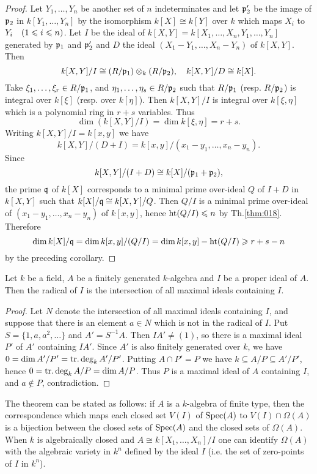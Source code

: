 \documentclass[../main]{subfiles}
\begin{document}
\begin{proof}
Let $Y_1,\ldots,Y_n$ be another set of $n$ indeterminates and let $\mathfrak{p}_2'$ be the image of $\mathfrak{p}_2$ in $k[Y_1,\ldots,Y_n]$ by the isomorphism $k[X]\cong k[Y]$ over $k$ which maps $X_i$ to $Y_i\for{1\leqslant i\leqslant n}$. Let $I$ be the ideal of $k[X,Y] = k[X_1,\ldots,X_n,Y_1,\ldots,Y_n]$ generated by $\mathfrak{p}_1$ and $\mathfrak{p}_2'$ and $D$ the ideal $(X_1-Y_1,\ldots,X_n-Y_n)$ of $k[X,Y]$. Then \[k[X,Y]/I \cong (R/\mathfrak{p}_1)\otimes_k(R/\mathfrak{p}_2),\quad k[X,Y]/D \cong k[X].\] Take $\xi_1,\dots,\xi_r\in R/\mathfrak{p}_1$, and $\eta_1,\dots,\eta_s\in R/\mathfrak{p}_2$ such that $R/\mathfrak{p}_1$ (resp. $R/\mathfrak{p}_2$) is integral over $k[\xi]$ (resp. over $k[\eta]$). Then $k[X,Y]/I$ is integral over $k[\xi,\eta]$ which is a polynomial ring in $r+s$ variables. Thus \[\dim(k[X,Y]/I) = \dim k[\xi,\eta] = r+s.\] Writing $k[X,Y]/I = k[x,y]$ we have \[k[X,Y]/(D + I) = k[x,y]/(x_1-y_1,\ldots,x_n-y_n).\] Since \[k[X,Y]/(I + D) \cong k[X]/(\mathfrak{p}_1+\mathfrak{p}_2),\] the prime $\mathfrak{q}$ of $k[X]$ corresponds to a minimal prime over-ideal $Q$ of $I+D$ in $k[X,Y]$ such that $k[X]/\mathfrak{q} \cong k[X,Y]/Q$. Then $Q/I$ is a minimal prime over-ideal of $(x_1-y_1,\ldots,x_n-y_n)$ of $k[x,y]$, hence $\operatorname{ht}(Q/I)\leqslant n$ by Th.\ref{thm:018}. Therefore \[\operatorname{dim} k[X]/\mathfrak{q}=\operatorname{dim} k[x,y]/(Q/I) = \operatorname{dim} k[x,y] - \operatorname{ht}(Q/I)\geqslant r+s-n\] by the preceding corollary.
\end{proof}

\begin{partheorem}\label{thm:025}
Let $k$ be a field, $A$ be a finitely generated $k$-algebra and $I$ be a proper ideal of $A$. Then the radical of $I$ is the intersection of all maximal ideals containing $I$.
\end{partheorem}

\begin{proof}
Let $N$ denote the intersection of all maximal ideals containing $I$, and suppose that there is an element $a\in N$ which is not in the radical of $I$. Put $S = \{1,a,a^2,\ldots\}$ and $A' =S^{-1}A$. Then $IA'\neq(1)$, so there is a maximal ideal $P'$ of $A'$ containing $IA'$. Since $A'$ is also finitely generated over $k$, we have $0 = \operatorname{dim} A'/P' = \operatorname{tr. deg}_kA'/P'$. Putting $A\cap P' = P$ we have $k\subseteq A/P\subseteq A'/P'$, hence $0 = \operatorname{tr. deg}_kA/P = \operatorname{dim} A/P$. Thus $P$ is a maximal ideal of $A$ containing $I$, and $a\notin P$, contradiction.
\end{proof}

\begin{remark}
The theorem can be stated as follows: if $A$ is a $k$-algebra of finite type, then the correspondence which maps each closed set $V(I)$ of $\operatorname{Spec}(A)$ to $V(I)\cap\Omega(A)$ is a bijection between the closed sets of $\operatorname{Spec}(A)$ and the closed sets of $\Omega(A)$. When $k$ is algebraically closed and $A \cong k[X_1,\ldots,X_n]/I$ one can identify $\Omega(A)$ with the algebraic variety in $k^n$ defined by the ideal $I$ (i.e. the set of zero-points of $I$ in $k^n$). 
\end{remark}
\end{document}
